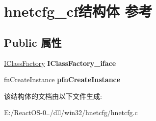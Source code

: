 \hypertarget{structhnetcfg__cf}{}\section{hnetcfg\+\_\+cf结构体 参考}
\label{structhnetcfg__cf}
\subsection*{Public 属性}
\begin{DoxyCompactItemize}
\item 
\mbox{\label{structhnetcfg__cf_a911d985a9bc7fd9004fea51fbf4bd8d0}} 
\hyperlink{interface_i_class_factory}{I\+Class\+Factory} {\bfseries I\+Class\+Factory\+\_\+iface}
\item 
\mbox{\label{structhnetcfg__cf_a5fcd4e7e4ad3495ac839d0a23028f9df}} 
fn\+Create\+Instance {\bfseries pfn\+Create\+Instance}
\end{DoxyCompactItemize}


该结构体的文档由以下文件生成\+:\begin{DoxyCompactItemize}
\item 
E\+:/\+React\+O\+S-\/0../dll/win32/hnetcfg/hnetcfg.\+c\end{DoxyCompactItemize}
